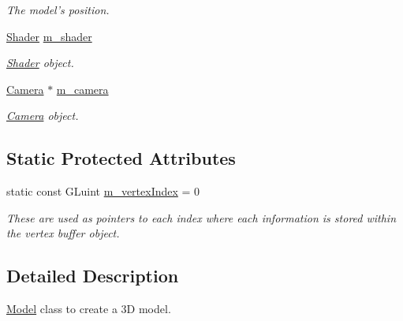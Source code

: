 \begin{CompactItemize}
\begin{CompactList}\small\item\em The model's position. \item\end{CompactList}\item 
\hypertarget{class_model_02e541e1a8ad04eb05e0729abcc7e0d5}{
\hyperlink{class_shader}{Shader} \hyperlink{class_model_02e541e1a8ad04eb05e0729abcc7e0d5}{m\_\-shader}}
\label{class_model_02e541e1a8ad04eb05e0729abcc7e0d5}

\begin{CompactList}\small\item\em \hyperlink{class_shader}{Shader} object. \item\end{CompactList}\item 
\hypertarget{class_model_7dae1bc84476979aa5c44335c63054b8}{
\hyperlink{class_camera}{Camera} $\ast$ \hyperlink{class_model_7dae1bc84476979aa5c44335c63054b8}{m\_\-camera}}
\label{class_model_7dae1bc84476979aa5c44335c63054b8}

\begin{CompactList}\small\item\em \hyperlink{class_camera}{Camera} object. \item\end{CompactList}\end{CompactItemize}
\subsection*{Static Protected Attributes}
\begin{CompactItemize}
\item 
\hypertarget{class_model_7ee034d94e2f05fb2a48712bcfa8e4dd}{
static const GLuint \hyperlink{class_model_7ee034d94e2f05fb2a48712bcfa8e4dd}{m\_\-vertexIndex} = 0}
\label{class_model_7ee034d94e2f05fb2a48712bcfa8e4dd}

\begin{CompactList}\small\item\em These are used as pointers to each index where each information is stored within the vertex buffer object. \item\end{CompactList}\end{CompactItemize}


\subsection{Detailed Description}
\hyperlink{class_model}{Model} class to create a 3D model. 

